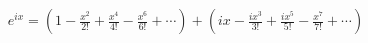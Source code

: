 \documentclass[preview]{standalone}
\begin{document}
\begin{align*}
e^{ix}= (1-\frac{x^2}{2!}+\frac{x^4}{4!}-\frac{x^6}{6!}+\cdots)+(ix-\frac{ix^3}{3!}+\frac{ix^5}{5!}-\frac{x^7}{7!}+\cdots)
\end{align*}
\end{document}
